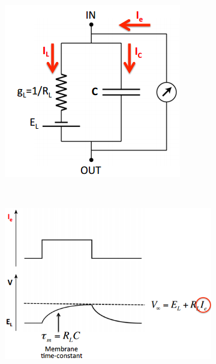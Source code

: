\documentclass[a4paper, 12pt]{article}
\begin{document}
\begin{figure}[H]
	\centering
	\begin{subfigure}[b]{0.3\textwidth}
		\centering
		\includegraphics[width=\textwidth]{membrane_circuit_01.png}
	\end{subfigure}%
	~
	\begin{subfigure}[b]{0.5\textwidth}
		\centering
		\includegraphics[width=\textwidth]{membrane_circuit_02.png}
	\end{subfigure}
\end{figure}
\end{document}
